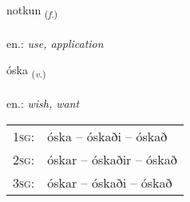 \documentclass[frontgrid, backgrid]{flacards}\usepackage[]{graphicx}\usepackage[]{xcolor}
\begin{document}
\renewcommand{\flhead}{\vskip5pt \fboxsep=0pt {\small\bfseries\footnotesize Nafnorð | Noun}}
\renewcommand{\fcfoot}{\vskip5pt \fboxsep=0pt \hspace{2pt}{\small\bfseries\footnotesize 1K}}

\renewcommand{\blhead}{\vskip5pt {\small\bfseries\footnotesize Nafnorð | Noun }}
\renewcommand{\bcfoot}{\vskip5pt \hspace{2pt}{\small\bfseries\footnotesize 1K}}


{notkun \small{\textsubscript{(\textit{f.})}} \\[1ex] %
\textphonetic{[nɔtkʏn]} \\
en.: \emph{use, application} \\  [2ex]
\renewcommand*{\arraystretch}{0.8}
}

\renewcommand{\flhead}{\vskip5pt \fboxsep=0pt {\small\bfseries\footnotesize Sagnorð | Verb}}
\renewcommand{\fcfoot}{\vskip5pt \fboxsep=0pt \hspace{2pt}{\small\bfseries\footnotesize 1K}}

\renewcommand{\blhead}{\vskip5pt {\small\bfseries\footnotesize Sagnorð | Verb }}
\renewcommand{\bcfoot}{\vskip5pt \hspace{2pt}{\small\bfseries\footnotesize 1K}}


{óska \small{\textsubscript{(\textit{v.})}} \\[1ex] %
\textphonetic{[ouska]} \\
en.: \emph{wish, want} \\  [2ex]
\renewcommand*{\arraystretch}{0.8}
\begin{tabular}{p{1cm}l}
\textsc{1sg}: & óska -- óskaði -- óskað \\ 
\textsc{2sg}: & óskar -- óskaðir -- óskað \\ 
\textsc{3sg}: & óskar -- óskaði -- óskað \\ 
\end{tabular}
}
\end{document}
